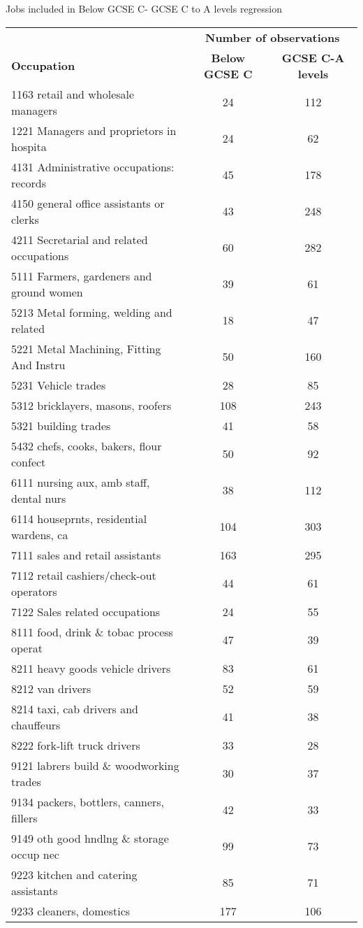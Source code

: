 \begin{threeparttable}[h!]
	\caption{Jobs included in Below GCSE C- GCSE C to A levels regression}
		\centering
	\begin{tabular}{lcc}
	\toprule
	\toprule
	&\multicolumn{2}{c}{\textbf{Number of observations}}\\
	\textbf{Occupation}&\textbf{ Below GCSE C}&\textbf{GCSE C-A levels}\\
\hline
1163 retail and wholesale managers&24&112 \\
1221 Managers and proprietors in hospita&24&62 \\
4131 Administrative occupations: records&45&178 \\
4150 general office assistants or clerks&43&248 \\
4211 Secretarial and related occupations&60&282 \\
5111 Farmers, gardeners and ground women&39&61 \\
5213 Metal forming, welding and related &18&47 \\
5221 Metal Machining, Fitting And Instru&50&160 \\
5231 Vehicle trades&28&85 \\
5312 bricklayers, masons, roofers&108&243 \\
5321 building trades&41&58 \\
5432 chefs, cooks, bakers, flour confect&50&92 \\
6111 nursing aux, amb staff, dental nurs&38&112 \\
6114 houseprnts, residential wardens, ca&104&303 \\
7111 sales and retail assistants&163&295 \\
7112 retail cashiers/check-out operators&44&61 \\
7122 Sales related occupations&24&55 \\
8111 food, drink \& tobac process operat&47&39 \\
8211 heavy goods vehicle drivers&83&61 \\
8212 van drivers&52&59 \\
8214 taxi, cab drivers and chauffeurs&41&38 \\
8222 fork-lift truck drivers&33&28 \\
9121 labrers build \& woodworking trades&30&37 \\
9134 packers, bottlers, canners, fillers&42&33 \\
9149 oth good hndlng \& storage occup nec&99&73 \\
9223 kitchen and catering assistants&85&71 \\
9233 cleaners, domestics&177&106 \\
\bottomrule
\bottomrule
\end{tabular}
\end{threeparttable}
